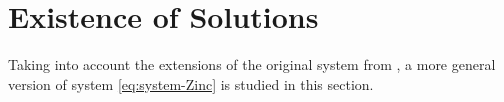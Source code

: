 \documentclass[11pt]{article}
\begin{document}











\newpage
\section{Existence of Solutions}
\label{sec:Existence}

Taking into account the extensions of the original system from \cite{Ptashnyk-2011}, a more general version of system \eqref{eq:system-Zinc} is studied in this section. 
\end{document}
